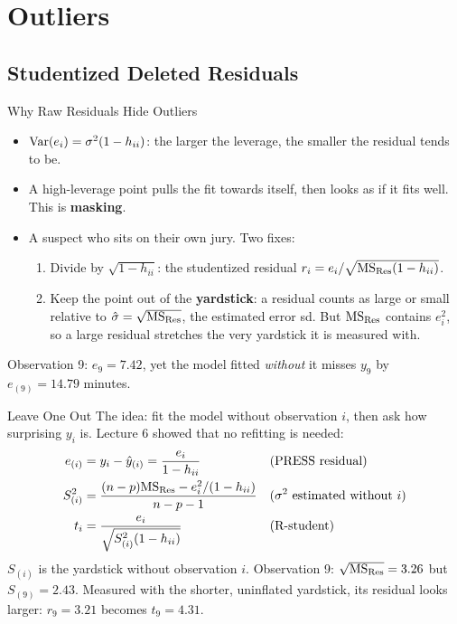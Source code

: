 \section{Outliers}


\subsection{Studentized Deleted Residuals}


\begin{frame}{Why Raw Residuals Hide Outliers}
    \begin{itemize}
        \item $\operatorname{Var}(e_i)=\sigma^2(1-h_{ii})$: the larger the leverage, the smaller the residual tends to be.
        \item A high-leverage point pulls the fit towards itself, then looks as if it fits well. This is \textbf{masking}.
        \item A suspect who sits on their own jury. Two fixes:
        \begin{enumerate}
            \item Divide by $\sqrt{1-h_{ii}}$: the studentized residual $r_i=e_i/\sqrt{\mathrm{MS}_{\mathrm{Res}}(1-h_{ii})}$.
            \item Keep the point out of the \textbf{yardstick}: a residual counts as large or small relative to $\hat\sigma=\sqrt{\mathrm{MS}_{\mathrm{Res}}}$, the estimated error sd. But $\mathrm{MS}_{\mathrm{Res}}$ contains $e_i^2$, so a large residual stretches the very yardstick it is measured with.
        \end{enumerate}
    \end{itemize}
    \svspace{0.3em}
    Observation 9: $e_9=7.42$, yet the model fitted \emph{without} it misses $y_9$ by $e_{(9)}=14.79$ minutes.
\end{frame}


\begin{frame}{Leave One Out}
    The idea: fit the model without observation $i$, then ask how surprising $y_i$ is. Lecture 6 showed that no refitting is needed:
    \begin{align*}
        e_{(i)} &= y_i-\hat y_{(i)}=\frac{e_i}{1-h_{ii}}
        && \text{(PRESS residual)} \\
        S_{(i)}^2 &= \frac{(n-p)\mathrm{MS}_{\mathrm{Res}}-e_i^2/(1-h_{ii})}{n-p-1}
        && \text{($\sigma^2$ estimated without $i$)} \\
        t_i &= \frac{e_i}{\sqrt{S_{(i)}^2(1-h_{ii})}}
        && \text{(R-student)}
    \end{align*}
    $S_{(i)}$ is the yardstick without observation $i$. Observation 9: $\sqrt{\mathrm{MS}_{\mathrm{Res}}}=3.26$ but $S_{(9)}=2.43$. Measured with the shorter, uninflated yardstick, its residual looks larger: $r_9=3.21$ becomes $t_9=4.31$.
\end{frame}


